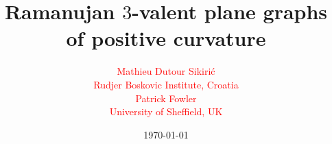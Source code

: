 \documentclass{beamer}
\begin{document}
\title{Ramanujan $3$-valent plane graphs of positive curvature}
\author{
{\small
\begin{multicols}{2}
\textcolor{red}{\large Mathieu Dutour Sikiri\'c}\\[2mm]
\textcolor{red}{Rudjer Boskovic Institute, Croatia}\\[2mm]
\textcolor{red}{\large Patrick Fowler}\\[2mm]
\textcolor{red}{University of Sheffield, UK}
\end{multicols}
}
}
\date{\today} 
\frame{\titlepage} 





\end{document}
